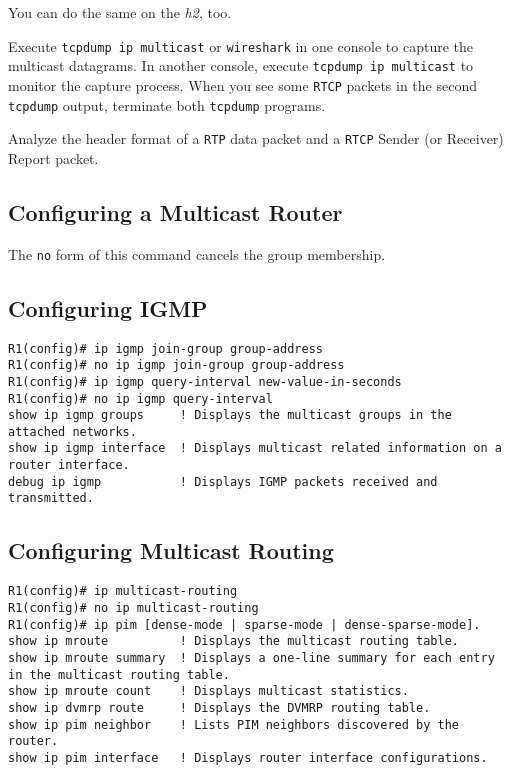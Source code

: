 \documentclass{../UTNetLab}
\begin{document}
    You can do the same on the \textit{h2}, too.


    Execute \lstinline{tcpdump ip multicast} or \lstinline{wireshark} in one console to capture the multicast datagrams.
    In another console, execute \lstinline{tcpdump ip multicast} to monitor the capture process.
    When you see some \texttt{RTCP} packets in the second \lstinline{tcpdump} output, terminate both \lstinline{tcpdump} programs.

    \begin{report}
    \item Analyze the header format of a \texttt{RTP} data packet and a \texttt{RTCP} Sender (or Receiver) Report packet.
    \end{report}

\clearpage
\begin{appendices}

\section{Configuring a Multicast Router}
    The \lstinline[language={cisco}]{no} form of this command cancels the group membership.
    \begin{subappendices}
\subsection{Configuring IGMP}

    \begin{lstlisting}[language={cisco}, emph={group-address, new-value-in-seconds}]
R1(config)# ip igmp join-group group-address
R1(config)# no ip igmp join-group group-address
R1(config)# ip igmp query-interval new-value-in-seconds
R1(config)# no ip igmp query-interval
show ip igmp groups     ! Displays the multicast groups in the attached networks.
show ip igmp interface  ! Displays multicast related information on a router interface.
debug ip igmp           ! Displays IGMP packets received and transmitted.
    \end{lstlisting}

\subsection{Configuring Multicast Routing}

    \begin{lstlisting}[language={cisco}]
R1(config)# ip multicast-routing
R1(config)# no ip multicast-routing
R1(config)# ip pim [dense-mode | sparse-mode | dense-sparse-mode].
show ip mroute          ! Displays the multicast routing table.
show ip mroute summary  ! Displays a one-line summary for each entry in the multicast routing table.
show ip mroute count    ! Displays multicast statistics.
show ip dvmrp route     ! Displays the DVMRP routing table.
show ip pim neighbor    ! Lists PIM neighbors discovered by the router.
show ip pim interface   ! Displays router interface configurations.
    \end{lstlisting}


\end{subappendices}
\end{appendices}
\end{document}
